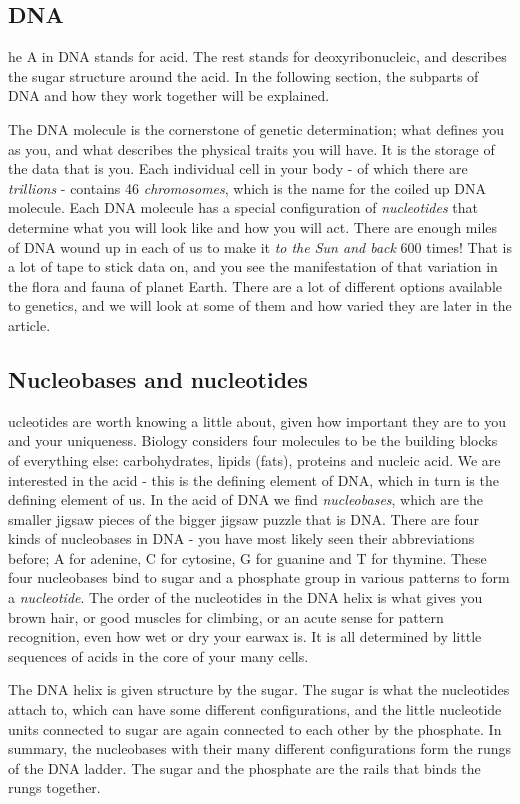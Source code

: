\subsection{DNA}
he A in DNA stands for acid.
The rest stands for deoxyribonucleic, and describes the sugar structure around the acid.
In the following section, the subparts of DNA and how they work together will be explained.

The DNA molecule is the cornerstone of genetic determination; what defines you as you, and what describes the physical traits you will have.
It is the storage of the data that is you.
Each individual cell in your body - of which there are \emph{trillions} - contains 46 \emph{chromosomes}, which is the name for the coiled up DNA molecule.
Each DNA molecule has a special configuration of \emph{nucleotides} that determine what you will look like and how you will act.
There are enough miles of DNA wound up in each of us to make it \emph{to the Sun and back} 600 times!
That is a lot of tape to stick data on, and you see the manifestation of that variation in the flora and fauna of planet Earth.
There are a lot of different options available to genetics, and we will look at some of them and how varied they are later in the article.

\subsection{Nucleobases and nucleotides}
ucleotides are worth knowing a little about, given how important they are to you and your uniqueness.
Biology considers four molecules to be the building blocks of everything else: carbohydrates, lipids (fats), proteins and nucleic acid.
We are interested in the acid - this is the defining element of DNA, which in turn is the defining element of us.
In the acid of DNA we find \emph{nucleobases}, which are the smaller jigsaw pieces of the bigger jigsaw puzzle that is DNA.
There are four kinds of nucleobases in DNA - you have most likely seen their abbreviations before; A for adenine, C for cytosine, G for guanine and T for thymine.
These four nucleobases bind to sugar and a phosphate group in various patterns to form a \emph{nucleotide}.
The order of the nucleotides in the DNA helix is what gives you brown hair, or good muscles for climbing, or an acute sense for pattern recognition, even how wet or dry your earwax is.
It is all determined by little sequences of acids in the core of your many cells.

The DNA helix is given structure by the sugar.
The sugar is what the nucleotides attach to, which can have some different configurations, and the little nucleotide units connected to sugar are again connected to each other by the phosphate.
In summary, the nucleobases with their many different configurations form the rungs of the DNA ladder.
The sugar and the phosphate are the rails that binds the rungs together.

